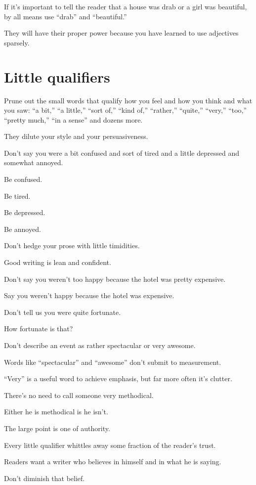 \documentclass{book}
\numberwithin{equation}{section}
\begin{document}
If it's important to tell the reader that a house was drab or a girl was beautiful, by all means use ``drab'' and ``beautiful.''

They will have their proper power because you have learned to use adjectives sparsely.

\section{Little qualifiers}
Prune out the small words that qualify how you feel and how you think and what you saw: ``a bit,'' ``a little,'' ``sort of,'' ``kind of,'' ``rather,'' ``quite,'' ``very,'' ``too,'' ``pretty much,'' ``in a sense'' and dozens more.

They dilute your style and your persuasiveness.

%
Don't say you were a bit confused and sort of tired and a little depressed and somewhat annoyed.

Be confused.

Be tired.

Be depressed.

Be annoyed.

Don't hedge your prose with little timidities.

Good writing is lean and confident.

%
Don't say you weren't too happy because the hotel was pretty expensive.

Say you weren't happy because the hotel was expensive.

Don't tell us you were quite fortunate.

How fortunate is that?

Don't describe an event as rather spectacular or very awesome.

Words like ``spectacular'' and ``awesome'' don't submit to measurement.

``Very'' is a useful word to achieve emphasis, but far more often it's clutter.

There's no need to call someone very methodical.

Either he is methodical is he isn't.

%
The large point is one of authority.

Every little qualifier whittles away some fraction of the reader's trust.

Readers want a writer who believes in himself and in what he is saying.

Don't diminish that belief.
\end{document}
